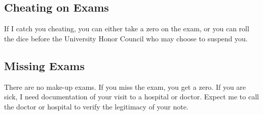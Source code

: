 \subsection*{Cheating on Exams}

If I catch you cheating, you can either take a zero on the exam, or you can roll the dice before the University Honor Council who may choose to suspend you. %


\subsection*{Missing Exams}

There are no make-up exams. If you miss the exam, you get a zero. If you are sick, I need documentation of your visit to a hospital or doctor. Expect me to call the doctor or hospital to verify the legitimacy of your note. %
